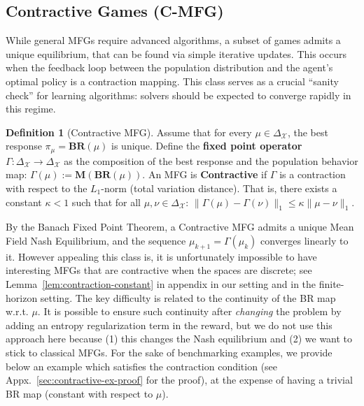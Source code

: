 \documentclass[10pt,twocolumn,letterpaper]{article}
\theoremstyle{definition}
\newtheorem{definition}[theorem]{Definition}
\theoremstyle{remark}
\newcommand{\states}{\mathcal{X}}
\newcommand{\BR}{\mathbf{BR}}
\begin{document}
\subsection{Contractive Games (C-MFG)}
While general MFGs require advanced algorithms, a subset of games admits a unique equilibrium, that can be found via simple iterative updates. This occurs when the feedback loop between the population distribution and the agent's optimal policy is a contraction mapping. This class serves as a crucial ``sanity check'' for learning algorithms: solvers should be expected to converge rapidly in this regime.
\vspace{0.2cm}
\begin{mdframed}[
    linewidth=0pt,        %
    roundcorner=5pt,        %
    backgroundcolor=blue!5, 
    innertopmargin=4pt, 
    innerbottommargin=6pt
]
\begin{definition}[Contractive MFG]
\label{def:contractive_mfg}
    Assume that for every $\mu \in \Delta_{\states}$, the best response $\pi_\mu = \BR(\mu)$ is unique. Define the \textbf{fixed point operator} $\Gamma: \Delta_{\states} \to \Delta_{\states}$ as the composition of the best response and the population behavior map: $\Gamma(\mu) := \mathbf{M}(\BR(\mu))$.
    An MFG is \textbf{Contractive} if $\Gamma$ is a contraction with respect to the $L_1$-norm (total variation distance). That is, there exists a constant $\kappa < 1$ such that for all $\mu, \nu \in \Delta_{\states}$:
    \(
        \|\Gamma(\mu) - \Gamma(\nu)\|_1 \le \kappa \|\mu - \nu\|_1.
    \)
\end{definition}
\end{mdframed}
By the Banach Fixed Point Theorem, a Contractive MFG admits a unique Mean Field Nash Equilibrium, and the sequence $\mu_{k+1} = \Gamma(\mu_k)$ converges linearly to it. However appealing this class is, it is unfortunately impossible to have interesting MFGs that are contractive when the spaces are discrete; see Lemma~\ref{lem:contraction-constant} in appendix in our setting and \citep[Theorem 2]{cui2021approximately} in the finite-horizon setting. The key difficulty is related to the continuity of the BR map w.r.t. $\mu$. It is possible to ensure such continuity after \emph{changing} the problem by adding an entropy regularization term in the reward, but we do not use this approach here because (1) this changes the Nash equilibrium and (2) we want to stick to classical MFGs. For the sake of benchmarking examples, we provide below an example which satisfies the contraction condition (see Appx.~\ref{sec:contractive-ex-proof} for the proof), at the expense of having a trivial BR map (constant with respect to $\mu$).
\end{document}
